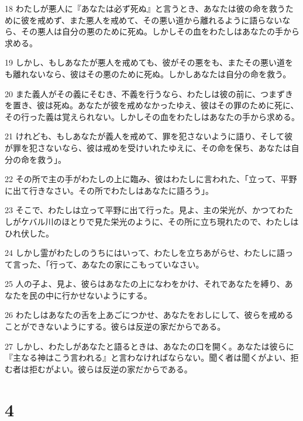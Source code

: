 \par 18 わたしが悪人に『あなたは必ず死ぬ』と言うとき、あなたは彼の命を救うために彼を戒めず、また悪人を戒めて、その悪い道から離れるように語らないなら、その悪人は自分の悪のために死ぬ。しかしその血をわたしはあなたの手から求める。
\par 19 しかし、もしあなたが悪人を戒めても、彼がその悪をも、またその悪い道をも離れないなら、彼はその悪のために死ぬ。しかしあなたは自分の命を救う。
\par 20 また義人がその義にそむき、不義を行うなら、わたしは彼の前に、つまずきを置き、彼は死ぬ。あなたが彼を戒めなかったゆえ、彼はその罪のために死に、その行った義は覚えられない。しかしその血をわたしはあなたの手から求める。
\par 21 けれども、もしあなたが義人を戒めて、罪を犯さないように語り、そして彼が罪を犯さないなら、彼は戒めを受けいれたゆえに、その命を保ち、あなたは自分の命を救う」。
\par 22 その所で主の手がわたしの上に臨み、彼はわたしに言われた、「立って、平野に出て行きなさい。その所でわたしはあなたに語ろう」。
\par 23 そこで、わたしは立って平野に出て行った。見よ、主の栄光が、かつてわたしがケバル川のほとりで見た栄光のように、その所に立ち現れたので、わたしはひれ伏した。
\par 24 しかし霊がわたしのうちにはいって、わたしを立ちあがらせ、わたしに語って言った、「行って、あなたの家にこもっていなさい。
\par 25 人の子よ、見よ、彼らはあなたの上になわをかけ、それであなたを縛り、あなたを民の中に行かせないようにする。
\par 26 わたしはあなたの舌を上あごにつかせ、あなたをおしにして、彼らを戒めることができないようにする。彼らは反逆の家だからである。
\par 27 しかし、わたしがあなたと語るときは、あなたの口を開く。あなたは彼らに『主なる神はこう言われる』と言わなければならない。聞く者は聞くがよい、拒む者は拒むがよい。彼らは反逆の家だからである。

\chapter{4}

